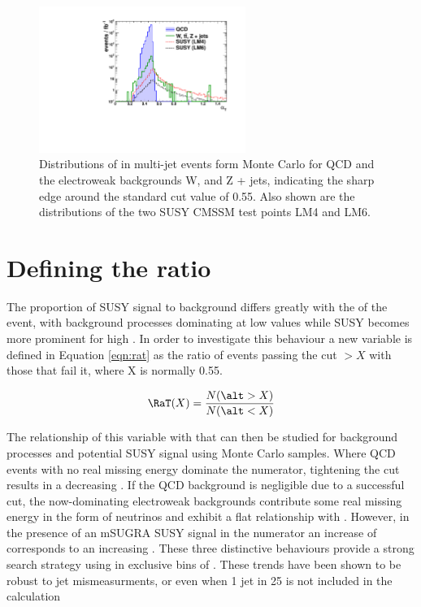 \begin{figure}[htbp]
\begin{center}
\includegraphics[width=0.6\textwidth]{Figures/AlphaT/ThesisATPlot}
\caption{\label{fig:atedge}Distributions of \alt in multi-jet events form Monte Carlo for QCD and the electroweak backgrounds W, \tto and Z + jets, indicating the sharp edge around the standard cut value of 0.55. Also shown are the distributions of the two SUSY CMSSM test points LM4 and LM6.}
\end{center}
\end{figure}


\section{Defining the ratio \RaT}
\label{sec:atrat}

The proportion of SUSY signal to background differs greatly with the \HT of the event, with background processes dominating at low values while SUSY becomes more prominent for high \HT. In order to investigate this behaviour a new variable \RaT is defined in Equation \ref{eqn:rat} as the ratio of events passing the cut \alt $> X$ with those that fail it, where X is normally 0.55. 

\begin{equation}
\RaT(X) = \frac{N(\alt > X)}{N(\alt < X)}
\label{eqn:rat}
\end{equation}

The relationship of this variable with \HT that can then be studied for background processes and potential SUSY signal using Monte Carlo samples. Where QCD events with no real missing energy dominate the numerator, tightening the \HT cut results in a decreasing \RaT. If the QCD background is negligible due to a successful \alt cut, the now-dominating  electroweak backgrounds contribute some real missing energy in the form of neutrinos and exhibit a flat relationship with \HT. However, in the presence of an mSUGRA SUSY signal in the numerator an increase of \HT corresponds to an increasing \RaT. These three distinctive behaviours provide a strong search strategy using \RaT in exclusive bins of \HT. These trends have been shown to be robust to jet mismeasurments, or even when 1 jet in 25 is not included in the calculation \cite{an2010_119}



